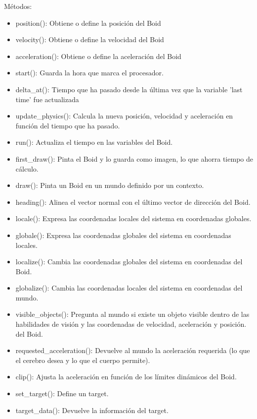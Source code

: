 Métodos:
\begin{itemize}
 \item position():
Obtiene o define la posición del Boid

  \item velocity():
Obtiene o define la velocidad del Boid

  \item acceleration():
Obtiene o define la aceleración del Boid

  \item start():
Guarda la hora que marca el procesador.

  \item delta\_at():
Tiempo que ha pasado desde la última vez que la variable 'last time' fue actualizada

  \item update\_physics():
Calcula la nueva posición, velocidad y aceleración en función del tiempo que ha pasado.

  \item run():
Actualiza el tiempo en las variables del Boid.

  \item first\_draw():
Pinta el Boid y lo guarda como imagen, lo que ahorra tiempo de cálculo.

  \item draw():
Pinta un Boid en un mundo definido por un contexto.

  \item heading():
Alinea el vector normal con el último vector de dirección del Boid.

  \item locale():
Expresa las coordenadas locales del sistema en coordenadas globales.

  \item globale():
Expresa las coordenadas globales del sistema en coordenadas locales.

  \item localize():
Cambia las coordenadas globales del sistema en coordenadas del Boid.

  \item globalize():
Cambia las coordenadas locales del sistema en coordenadas del mundo.

  \item visible\_objects():  
Pregunta al mundo si existe un objeto visible dentro de las habilidades de visión y las coordenadas de velocidad, aceleración y posición.
del Boid.

  \item requested\_acceleration(): Devuelve al mundo la aceleración requerida (lo que el cerebro desea y lo que el cuerpo permite).

  \item clip():
Ajusta la aceleración en función de los límites dinámicos del Boid.

  \item set\_target():
Define un target.

  \item  target\_data():
Devuelve la información del target.
\end{itemize}



